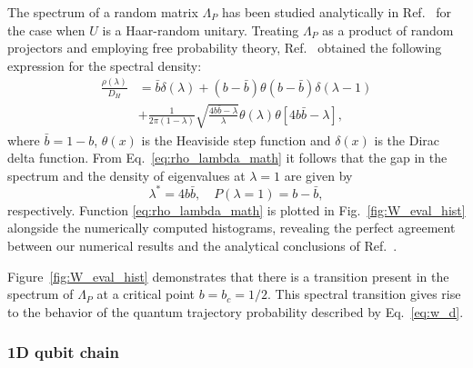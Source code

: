 \documentclass[%
 reprint,
 superscriptaddress,
 amsmath,amssymb,
prx,
]{revtex4-2}\href{\href{}{}}{}
\begin{document}
The spectrum of a random matrix $\Lambda_P$ has been studied analytically in Ref.~\cite{Collins2005} for the case when $U$ is a Haar-random unitary.
Treating $\Lambda_P$ as a product of random projectors and employing free probability theory, Ref.~\cite{Collins2005} obtained the following expression for the spectral density:
\begin{align}
    \frac{\rho(\lambda)}{D_H}&= \bar b\delta(\lambda) + (b-\bar b)\theta(b-\bar b)\delta(\lambda-1) \nonumber\\ 
    &+\frac{1}{2\pi(1-\lambda)}\sqrt{\frac{4b\bar b-\lambda}{\lambda}}\theta(\lambda)\theta\left[4b\bar b-\lambda\right],
    \label{eq:rho_lambda_math}
\end{align}
where $\bar b=1-b$, $\theta(x)$ is the Heaviside step function and $\delta(x)$ is the Dirac delta function.
From Eq.~\eqref{eq:rho_lambda_math} it follows that the gap in the spectrum and the density of eigenvalues at $\lambda=1$ are given by
\begin{equation}
    \lambda^{\ast}=4b\bar b,\quad P(\lambda=1)=b-\bar b,
\end{equation}
respectively.
Function \eqref{eq:rho_lambda_math} is plotted in Fig.~\ref{fig:W_eval_hist} alongside the numerically computed histograms, revealing the perfect agreement between our numerical results and the analytical conclusions of Ref.~\cite{Collins2005}.

Figure~\ref{fig:W_eval_hist} demonstrates that there is a transition present in the spectrum of $\Lambda_P$ at a critical point $b=b_c=1/2$.
This spectral transition gives rise to the behavior of the quantum trajectory probability described by Eq.~\eqref{eq:w_d}.



\subsubsection{1D qubit chain}
\end{document}
